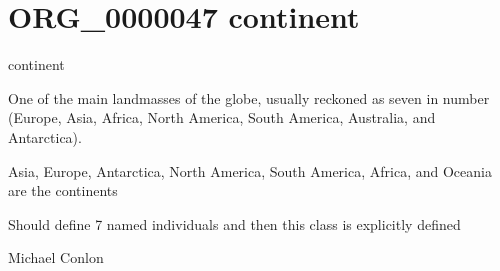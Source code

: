 \documentclass[letterpaper,10pt,english]{sphinxmanual}
\begin{document}
\section{ORG\_0000047 \sphinxhyphen{} continent}
\label{\detokenize{doc-ORG_0000047:org-0000047-continent}}\label{\detokenize{doc-ORG_0000047:index-0}}\label{\detokenize{doc-ORG_0000047::doc}}
\begin{sphinxShadowBox}

\sphinxAtStartPar
continent
\end{sphinxShadowBox}

\begin{sphinxShadowBox}

\sphinxAtStartPar
One of the main landmasses of the globe, usually reckoned as seven in number (Europe, Asia, Africa, North America, South America, Australia, and Antarctica).
\end{sphinxShadowBox}

\begin{sphinxShadowBox}

\sphinxAtStartPar
{}
\end{sphinxShadowBox}

\begin{sphinxShadowBox}

\sphinxAtStartPar
Asia, Europe, Antarctica, North America, South America, Africa, and Oceania are the continents
\end{sphinxShadowBox}

\begin{sphinxShadowBox}

\sphinxAtStartPar
Should define 7 named individuals and then this class is explicitly defined
\end{sphinxShadowBox}

\begin{sphinxShadowBox}

\sphinxAtStartPar
{}
\end{sphinxShadowBox}

\begin{sphinxShadowBox}

\sphinxAtStartPar
Michael Conlon 
\end{sphinxShadowBox}
\begin{quote}
\label{\detokenize{doc-ORG_0000048:org-0000048}}\label{\detokenize{doc-ORG_0000048:country}}\label{\detokenize{doc-ORG_0000048:org-0000048}}
\ignorespaces \end{quote}
\end{document}
